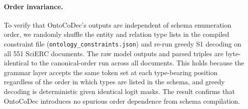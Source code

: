 
\paragraph{Order invariance.}
\label{app:order-invariance}
To verify that OntoCoDec's outputs are independent of schema enumeration order, we randomly shuffle the entity and relation type lists in the compiled constraint file (\texttt{ontology\_constraints.json}) and re-run greedy S1 decoding on all 551 SciERC documents.
The raw model outputs and parsed triples are byte-identical to the canonical-order run across all documents.
This holds because the grammar layer accepts the same token set at each type-bearing position regardless of the order in which types are listed in the schema, and greedy decoding is deterministic given identical logit masks.
The result confirms that OntoCoDec introduces no spurious order dependence from schema compilation.
